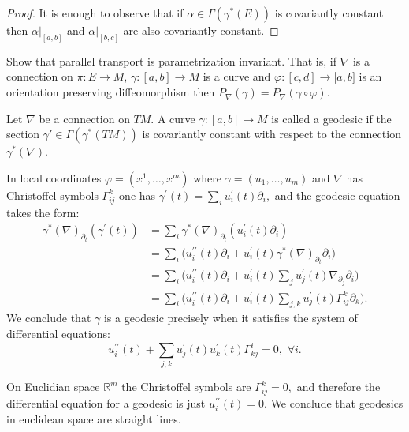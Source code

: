 \begin{proof}
	It is enough to observe that if $\alpha \in \Gamma(\gamma^*(E))$ is covariantly constant then $ \alpha\vert_{[a,b]}$ and $\alpha\vert_{[b,c]}$ are also covariantly constant.
\end{proof}


\begin{exercise}
	Show that parallel transport is parametrization invariant. That is, if $\nabla$ is a
	connection on $\pi:E\rightarrow M$, $\gamma:[a,b]\rightarrow M$ is a curve and
	$\varphi:[c,d]\rightarrow\lbrack a,b]$ is an orientation preserving
	diffeomorphism then $P_{\nabla}(\gamma)=P_{\nabla}(\gamma\circ\varphi).$
\end{exercise}


\begin{definition}
	Let $\nabla$ be a connection on $TM$. A curve $\gamma:[a,b]\rightarrow M$ is called a geodesic if the
	section $\gamma' \in \Gamma( \gamma^*(TM))$ is covariantly constant with respect to the
	connection $\gamma^{\ast}(\nabla)$.
\end{definition}

In local coordinates $\varphi=(x^{1},\dots,x^{m})$ where $\gamma=(u_{1}%
,\dots,u_{m})$ and $\nabla$ has Christoffel symbols $\Gamma_{ij}^{k}$ one has
$\gamma^{\prime}(t)=\sum_{i}u_{i}^{\prime}(t)\partial_{i},$
and the geodesic equation takes the form:
\begin{align*}
\gamma^{\ast}(\nabla)_{\partial_{t}}(\gamma^{\prime}(t))  &  =\sum_{i}%
\gamma^{\ast}(\nabla)_{\partial_{t}}(u_{i}^{\prime}(t)\partial_{i})\\
&  =\sum_{i}\Big(u_{i}^{\prime\prime}(t)\partial_{i}+u_{i}^{\prime}%
(t)\gamma^{\ast}(\nabla)_{\partial_{t}}\partial_{i}\Big)\\
&  =\sum_{i}\Big(u_{i}^{\prime\prime}(t)\partial_{i}+u_{i}^{\prime}(t)\sum
_{j}u_{j}^{\prime}(t)\nabla_{\partial_{j}}\partial_{i}\Big)\\
&  =\sum_{i}\Big(u_{i}^{\prime\prime}(t)\partial_{i}+u_{i}^{\prime}%
(t)\sum_{j,k}u_{j}^{\prime}(t)\Gamma_{ij}^{k}\partial_{k}\Big).
\end{align*}
We conclude that $\gamma$ is a geodesic precisely when it satisfies the system
of differential equations:
\begin{equation}
u_{i}^{\prime\prime}(t)+\sum_{j,k}u_{j}^{\prime}(t)u_{k}^{\prime}%
(t)\Gamma_{kj}^{i}=0,\,\,  \forall i.
\end{equation}


\begin{example}
	On Euclidian space $\mathbb{R}^{m}$ the Christoffel symbols are $\Gamma
	_{ij}^{k}=0,$ and therefore the differential equation for a geodesic is just
	$u_{i}^{\prime\prime}(t)=0.$ We conclude that geodesics in euclidean space are
	straight lines.
\end{example}


